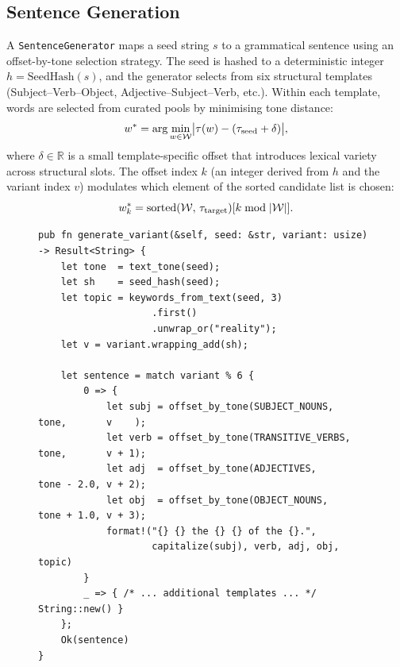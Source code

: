 \documentclass[11pt,a4paper]{article}
\begin{document}
\subsection{Sentence Generation}
\label{sec:sentence}

A \texttt{SentenceGenerator} maps a seed string $s$ to a grammatical sentence using an offset-by-tone selection strategy. The seed is hashed to a deterministic integer $h = \text{SeedHash}(s)$, and the generator selects from six structural templates (Subject--Verb--Object, Adjective--Subject--Verb, etc.). Within each template, words are selected from curated pools by minimising tone distance:
\begin{equation}
  w^* = \arg\min_{w \in \mathcal{W}} \bigl|\tau(w) - (\tau_{\rm seed} + \delta)\bigr|,
  \label{eq:tone_select}
\end{equation}
where $\delta \in \mathbb{R}$ is a small template-specific offset that introduces lexical variety across structural slots. The offset index $k$ (an integer derived from $h$ and the variant index $v$) modulates which element of the sorted candidate list is chosen:
\begin{equation}
  w^*_k = \text{sorted}(\mathcal{W},\,\tau_{\rm target})[k \bmod |\mathcal{W}|].
  \label{eq:offset}
\end{equation}

\begin{figure}[H]
\begin{lstlisting}[style=code, caption={Sentence generation; simplified Rust}, label={lst:sentence}]
pub fn generate_variant(&self, seed: &str, variant: usize) -> Result<String> {
    let tone  = text_tone(seed);
    let sh    = seed_hash(seed);
    let topic = keywords_from_text(seed, 3)
                    .first()
                    .unwrap_or("reality");
    let v = variant.wrapping_add(sh);

    let sentence = match variant % 6 {
        0 => {
            let subj = offset_by_tone(SUBJECT_NOUNS,    tone,       v    );
            let verb = offset_by_tone(TRANSITIVE_VERBS, tone,       v + 1);
            let adj  = offset_by_tone(ADJECTIVES,       tone - 2.0, v + 2);
            let obj  = offset_by_tone(OBJECT_NOUNS,     tone + 1.0, v + 3);
            format!("{} {} the {} {} of the {}.",
                    capitalize(subj), verb, adj, obj, topic)
        }
        _ => { /* ... additional templates ... */ String::new() }
    };
    Ok(sentence)
}
\end{lstlisting}
\end{figure}
\end{document}
